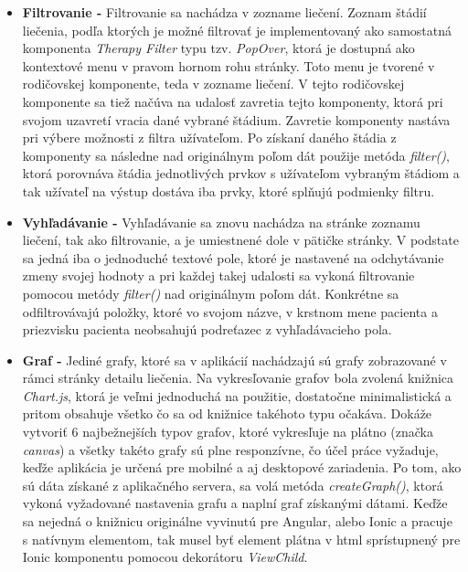 \begin{itemize}
\item \textbf{Filtrovanie -} Filtrovanie sa nachádza v zozname liečení. Zoznam štádií liečenia, podľa ktorých je možné filtrovať je implementovaný ako samostatná komponenta \textit{Therapy Filter} typu tzv. \textit{PopOver}, ktorá je dostupná ako kontextové menu  v pravom hornom rohu stránky. Toto menu je tvorené v rodičovskej komponente, teda v zozname liečení. V tejto rodičovskej komponente sa tiež načúva na udalosť zavretia tejto komponenty, ktorá pri svojom uzavretí vracia dané vybrané štádium. Zavretie komponenty nastáva pri výbere možnosti z filtra užívateľom. Po získaní daného štádia z komponenty sa následne nad originálnym poľom dát použije metóda \textit{filter()}, ktorá porovnáva štádia jednotlivých prvkov s užívateľom vybraným štádiom a tak užívateľ na výstup dostáva iba prvky, ktoré splňujú podmienky filtru.
\item \textbf{Vyhľadávanie -} Vyhľadávanie sa znovu nachádza na stránke zoznamu liečení, tak ako filtrovanie, a je umiestnené dole v pätičke stránky. V podstate sa jedná iba o jednoduché textové pole, ktoré je nastavené na odchytávanie zmeny svojej hodnoty a pri každej takej udalosti sa vykoná filtrovanie pomocou metódy \textit{filter()} nad originálnym poľom dát.  Konkrétne sa odfiltrovávajú položky, ktoré vo svojom názve, v krstnom mene pacienta a priezvisku pacienta neobsahujú podreťazec z vyhľadávacieho pola.
\item \textbf{Graf -} Jediné grafy, ktoré sa v aplikácií nachádzajú sú grafy zobrazované v rámci stránky detailu liečenia. Na vykresľovanie grafov bola zvolená knižnica \textit{Chart.js}, ktorá je veľmi jednoduchá na použitie, dostatočne minimalistická a pritom obsahuje všetko čo sa od knižnice takéhoto typu očakáva. Dokáže vytvoriť 6 najbežnejších typov grafov, ktoré vykresľuje na plátno (značka \textit{canvas}) a všetky takéto grafy sú plne responzívne, čo účel práce vyžaduje, keďže aplikácia je určená pre mobilné a aj desktopové zariadenia. Po tom, ako sú dáta získané z aplikačného servera, sa volá metóda \textit{createGraph()}, ktorá vykoná vyžadované nastavenia grafu a naplní graf získanými dátami. Keďže sa nejedná o knižnicu originálne vyvinutú pre Angular, alebo Ionic a pracuje s natívnym elementom, tak musel byť element plátna v html sprístupnený pre Ionic komponentu pomocou dekorátoru \textit{ViewChild}.
\end{itemize}


